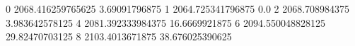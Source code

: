 0 2068.416259765625 3.69091796875
1 2064.725341796875 0.0
2 2068.708984375 3.983642578125
4 2081.392333984375 16.6669921875
6 2094.550048828125 29.82470703125
8 2103.4013671875 38.676025390625
